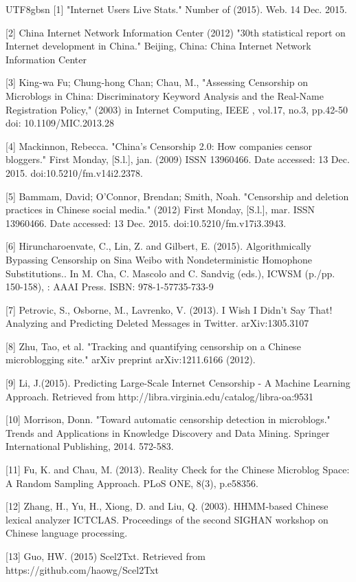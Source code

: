 \documentclass{article} %
\begin{document}
\begin{CJK*}{UTF8}{gbsn}
[1] "Internet Users Live Stats." Number of (2015). Web. 14 Dec. 2015.

[2] China Internet Network Information Center (2012) "30th statistical report on Internet development in China." Beijing, China: China Internet Network Information Center

[3] King-wa Fu; Chung-hong Chan; Chau, M., "Assessing Censorship on Microblogs in China: Discriminatory Keyword Analysis and the Real-Name Registration Policy," (2003) in Internet Computing, IEEE , vol.17, no.3, pp.42-50 doi: 10.1109/MIC.2013.28

[4] Mackinnon, Rebecca. "China’s Censorship 2.0: How companies censor bloggers." First Monday, [S.l.], jan. (2009) ISSN 13960466. Date accessed: 13 Dec. 2015. doi:10.5210/fm.v14i2.2378.

[5] Bammam, David; O'Connor, Brendan; Smith, Noah. "Censorship and deletion practices in Chinese social media." (2012) First Monday, [S.l.], mar. ISSN 13960466. Date accessed: 13 Dec. 2015. doi:10.5210/fm.v17i3.3943.

[6] Hiruncharoenvate, C., Lin, Z. and Gilbert, E. (2015). Algorithmically Bypassing Censorship on Sina Weibo with Nondeterministic Homophone Substitutions.. In M. Cha, C. Mascolo and C. Sandvig (eds.), ICWSM (p./pp. 150-158), : AAAI Press. ISBN: 978-1-57735-733-9 

[7] Petrovic, S., Osborne, M., Lavrenko, V. (2013). I Wish I Didn't Say That! Analyzing and Predicting Deleted Messages in Twitter. arXiv:1305.3107

[8] Zhu, Tao, et al. "Tracking and quantifying censorship on a Chinese microblogging site." arXiv preprint arXiv:1211.6166 (2012).

[9] Li, J.(2015). Predicting Large-Scale Internet Censorship - A Machine Learning Approach. Retrieved from http://libra.virginia.edu/catalog/libra-oa:9531

[10] Morrison, Donn. "Toward automatic censorship detection in microblogs." Trends and Applications in Knowledge Discovery and Data Mining. Springer International Publishing, 2014. 572-583.

[11] Fu, K. and Chau, M. (2013). Reality Check for the Chinese Microblog Space: A Random Sampling Approach. PLoS ONE, 8(3), p.e58356.

[12] Zhang, H., Yu, H., Xiong, D. and Liu, Q. (2003). HHMM-based Chinese lexical analyzer ICTCLAS. Proceedings of the second SIGHAN workshop on Chinese language processing.

[13] Guo, HW. (2015) Scel2Txt. Retrieved from https://github.com/haowg/Scel2Txt
\endgroup


\clearpage\end{CJK*}
\end{document}
